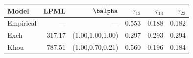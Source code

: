 \begin{tabular}{lrrrrr}
\hline\hline
Model & LPML & $\bar\balpha$ & $\tau_{12}$ & $\tau_{13}$ & $\tau_{23}$ \\
\hline
Empirical & --- & --- & 0.553 & 0.188 & 0.182 \\
Exch & 317.17 & (1.00,1.00,1.00) & 0.297 & 0.293 & 0.294 \\
Khou & 787.51 & (1.00,0.70,0.21) & 0.560 & 0.196 & 0.184 \\
\hline\hline
\end{tabular}
